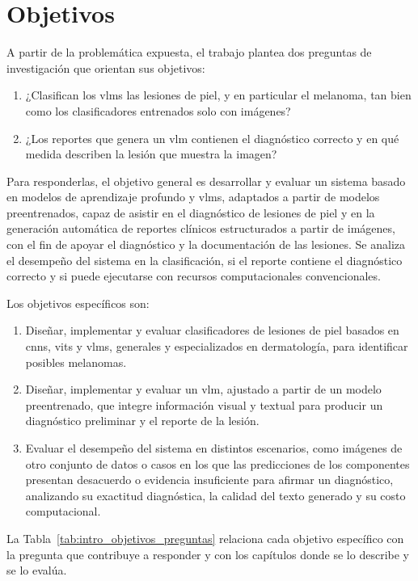 \section{Objetivos}
\label{sec:intro_objetivos}
A partir de la problemática expuesta, el trabajo plantea dos preguntas de investigación que orientan sus objetivos:
\begin{enumerate}[label=\textbf{PI\arabic*.}]
  \item ¿Clasifican los \glspl{vlm} las lesiones de piel, y en particular el melanoma, tan bien como los
  clasificadores entrenados solo con imágenes?
  \item ¿Los reportes que genera un \gls{vlm} contienen el diagnóstico correcto y en qué medida describen la lesión
  que muestra la imagen?
\end{enumerate}

Para responderlas, el objetivo general es desarrollar y evaluar un sistema basado en modelos de aprendizaje
profundo y \glspl{vlm}, adaptados a partir de modelos preentrenados, capaz de asistir en el diagnóstico de lesiones de piel y en la
generación automática de reportes clínicos estructurados a partir de imágenes, con el fin de apoyar el diagnóstico y la documentación de las lesiones. Se analiza el desempeño del sistema en la clasificación, si el reporte contiene el diagnóstico correcto y si puede ejecutarse con recursos computacionales convencionales.

Los objetivos específicos son:
\begin{enumerate}[label=\textbf{OE\arabic*.}]
  \item Diseñar, implementar y evaluar clasificadores de lesiones de piel basados en \glspl{cnn}, \glspl{vit}
  y \glspl{vlm}, generales y especializados en dermatología, para identificar posibles melanomas.
  \item Diseñar, implementar y evaluar un \gls{vlm}, ajustado a partir de un modelo preentrenado, que integre
  información visual y textual para producir un diagnóstico preliminar y el reporte de la lesión.
  \item Evaluar el desempeño del sistema en distintos escenarios, como imágenes de otro conjunto de datos o casos en
  los que las predicciones de los componentes presentan desacuerdo o evidencia insuficiente para afirmar un diagnóstico, analizando su exactitud diagnóstica, la calidad del texto generado y su costo computacional.
\end{enumerate}

La Tabla~\ref{tab:intro_objetivos_preguntas} relaciona cada objetivo específico con la pregunta que contribuye a
responder y con los capítulos donde se lo describe y se lo evalúa.

